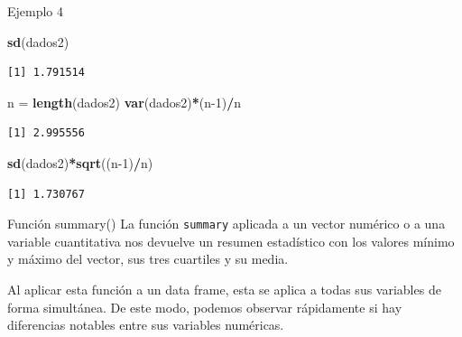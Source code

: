 \documentclass[
  ignorenonframetext,
]{beamer}
\newenvironment{Shaded}{\begin{snugshade}}{\end{snugshade}}
\newcommand{\DecValTok}[1]{\textcolor[rgb]{0.00,0.00,0.81}{#1}}
\newcommand{\FunctionTok}[1]{\textcolor[rgb]{0.13,0.29,0.53}{\textbf{#1}}}
\newcommand{\NormalTok}[1]{#1}
\newcommand{\OtherTok}[1]{\textcolor[rgb]{0.56,0.35,0.01}{#1}}
\newcommand{\SpecialCharTok}[1]{\textcolor[rgb]{0.81,0.36,0.00}{\textbf{#1}}}
\begin{document}
\begin{frame}[fragile]{Ejemplo 4}
\label{ejemplo-4-16}
\begin{Shaded}
\begin{Highlighting}[]
\FunctionTok{sd}\NormalTok{(dados2)}
\end{Highlighting}
\end{Shaded}

\begin{verbatim}
[1] 1.791514
\end{verbatim}

\begin{Shaded}
\begin{Highlighting}[]
\NormalTok{n }\OtherTok{=} \FunctionTok{length}\NormalTok{(dados2)}
\FunctionTok{var}\NormalTok{(dados2)}\SpecialCharTok{*}\NormalTok{(n}\DecValTok{{-}1}\NormalTok{)}\SpecialCharTok{/}\NormalTok{n}
\end{Highlighting}
\end{Shaded}

\begin{verbatim}
[1] 2.995556
\end{verbatim}

\begin{Shaded}
\begin{Highlighting}[]
\FunctionTok{sd}\NormalTok{(dados2)}\SpecialCharTok{*}\FunctionTok{sqrt}\NormalTok{((n}\DecValTok{{-}1}\NormalTok{)}\SpecialCharTok{/}\NormalTok{n)}
\end{Highlighting}
\end{Shaded}

\begin{verbatim}
[1] 1.730767
\end{verbatim}
\end{frame}

\begin{frame}[fragile]{Función summary()}
\label{funciuxf3n-summary}
La función \texttt{summary} aplicada a un vector numérico o a una
variable cuantitativa nos devuelve un resumen estadístico con los
valores mínimo y máximo del vector, sus tres cuartiles y su media.

Al aplicar esta función a un data frame, esta se aplica a todas sus
variables de forma simultánea. De este modo, podemos observar
rápidamente si hay diferencias notables entre sus variables numéricas.
\end{frame}
\end{document}
